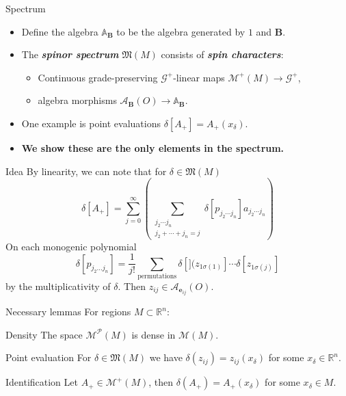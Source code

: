 \documentclass[aspectratio=169]{beamer}
\newcommand\boldgreen[1]{\textcolor{lighter_csu_green}{\emph{\textbf{#1}}}}
\newcommand\boldgold[1]{\textcolor{csu_gold}{\textbf{#1}}}
\newcommand{\R}{\mathbb{R}}
\newcommand{\algebra}{\mathcal{A}}
\newcommand{\G}{\mathcal{G}}
\newcommand{\characters}{\mathfrak{M}}
\newcommand{\monogenics}{\mathcal{M}}
\newcommand{\blade}[1]{\boldsymbol{#1}}
\newcommand{\bivector}{\blade{B}}
\begin{document}
\begin{frame}{Spectrum}
\vfill
\begin{itemize}
\pause
\item Define the algebra $\mathbb{A}_{\bivector}$ to be the algebra generated by $1$ and $\bivector$.
\pause
\item The \boldgreen{spinor spectrum} $\characters(M)$ consists of \boldgreen{spin characters}:
\begin{itemize}
  \item Continuous grade-preserving $\G^+$-linear maps $\monogenics^+(M) \to \G^+$,
  \item algebra morphisms $\algebra_{\bivector}(O) \to \mathbb{A}_{\bivector}$.
\end{itemize}
\pause
\item One example is point evaluations $\delta[A_+]=A_+(x_\delta)$.
\pause
\item \boldgold{We show these are the only elements in the spectrum.}
\end{itemize}
\vfill
\end{frame}

\begin{frame}{Idea}
\vfill
\pause By linearity, we can note that for $\delta \in \characters(M)$
\[
\delta[A_+] = \sum_{j=0}^\infty \left(\sum_{\substack{{j_2 \cdots j_n} \\ {j_2 + \cdots + j_n = j}}} \delta[p_{j_2 \cdots j_n}] a_{j_2 \cdots j_n} \right)
\]
\pause On each monogenic polynomial
\[
\delta[p_{j_2 \dots j_n}] = \frac{1}{j!} \sum_{\textrm{permutations}}\delta\left[](z_{1\sigma(1)}\right] \cdots \delta\left[z_{1\sigma(j)}\right]
\]
by the multiplicativity of $\delta$. \pause Then $z_{ij} \in \algebra_{\blade{e}_{ij}}(O)$.
\vfill
\end{frame}


\begin{frame}{Necessary lemmas}
\vfill
\pause
For regions $M\subset \R^n$:
\pause
\begin{lemm*}{Density}{}
The space $\monogenics^\mathcal{P}(M)$ is dense in $\monogenics(M)$.
\end{lemm*}
\pause
\begin{lemm*}{Point evaluation}{}
For $\delta \in \characters(M)$ we have $\delta(z_{ij})=z_{ij}(x_\delta)$ for some $x_\delta \in \R^n$.
\end{lemm*}
\pause
\begin{lemm*}{Identification}{}
Let $A_+\in \mathcal{M}^+(M)$, then $\delta (A_+)=A_+(x_\delta)$ for some $x_\delta \in M$.
\end{lemm*}
\vfill
\end{frame}
\end{document}
